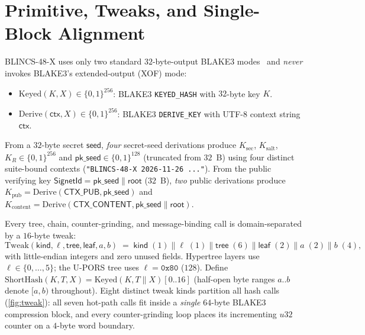 \documentclass[11pt,a4paper]{article}
\theoremstyle{definition}
\theoremstyle{remark}
\newcommand{\BLINCS}{\textsf{BLINCS-48-X}}
\newcommand{\UPORS}{\textsf{U-PORS}}
\newcommand{\BLAKE}{\textsf{BLAKE3}}
\newcommand{\Keyed}{\mathrm{Keyed}}
\newcommand{\Derive}{\mathrm{Derive}}
\newcommand{\ShortHash}{\mathrm{ShortHash}}
\newcommand{\Tweak}{\mathrm{Tweak}}
\newcommand{\bits}{\{0,1\}}
\begin{document}
\section{Primitive, Tweaks, and Single-Block Alignment}
\label{sec:prelim}

\BLINCS{} uses only two standard $32$-byte-output \BLAKE{} modes~\cite{oconnor2020blake3} and \emph{never} invokes \BLAKE{}'s extended-output (XOF) mode:
\begin{itemize}[leftmargin=1.4em,itemsep=2pt]
  \item $\Keyed(K, X) \in \bits^{256}$: \BLAKE{} \texttt{KEYED\_HASH} with $32$-byte key $K$.
  \item $\Derive(\mathsf{ctx}, X) \in \bits^{256}$: \BLAKE{} \texttt{DERIVE\_KEY} with UTF-8 context string $\mathsf{ctx}$.
\end{itemize}
From a $32$-byte secret $\mathsf{seed}$, \emph{four} secret-seed derivations produce $K_{\mathrm{sec}}$, $K_{\mathrm{salt}}$, $K_R \in \bits^{256}$ and $\mathsf{pk\_seed} \in \bits^{128}$ (truncated from $32$~B) using four distinct suite-bound contexts (\texttt{"BLINCS-48-X 2026-11-26 ..."}). From the public verifying key $\mathsf{SignetId} = \mathsf{pk\_seed} \parallel \mathsf{root}$ ($32$~B), \emph{two} public derivations produce $K_{\mathrm{pub}} = \Derive(\mathsf{CTX\_PUB}, \mathsf{pk\_seed})$ and $K_{\mathrm{content}} = \Derive(\mathsf{CTX\_CONTENT}, \mathsf{pk\_seed} \parallel \mathsf{root})$.

Every tree, chain, counter-grinding, and message-binding call is domain-separated by a $16$-byte tweak:
\[
  \Tweak(\mathsf{kind}, \ell, \mathsf{tree}, \mathsf{leaf}, a, b)
  \;=\;
  \mathsf{kind}\;(1) \parallel \ell\;(1) \parallel \mathsf{tree}\;(6) \parallel \mathsf{leaf}\;(2) \parallel a\;(2) \parallel b\;(4),
\]
with little-endian integers and zero unused fields. Hypertree layers use $\ell \in \{0,\dots,5\}$; the \UPORS{} tree uses $\ell = \mathtt{0x80}$ ($128$). Define $\ShortHash(K, T, X) = \Keyed(K, T \parallel X)[0..16]$ (half-open byte ranges $a..b$ denote $[a, b)$ throughout). Eight distinct tweak kinds partition all hash calls (\cref{fig:tweak}): all seven hot-path calls fit inside a \emph{single} $64$-byte \BLAKE{} compression block, and every counter-grinding loop places its incrementing $u32$ counter on a $4$-byte word boundary.
\end{document}
